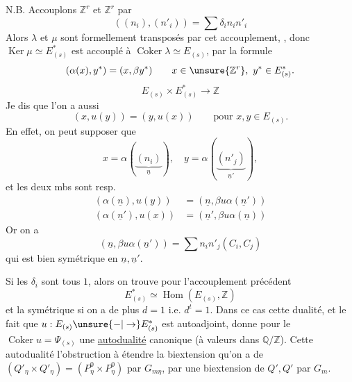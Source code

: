 N.B. Accouplons $\mathbb Z^r$ et $\mathbb Z^r$ par
\[
((n_i),(n'_i))=\sum\delta_i n_i n'_i
\]
Alors $\lambda$ et $\mu$ sont formellement transposés par cet accouplement,
, donc $\operatorname{Ker}\mu\simeq E^*_{(s)}$ est accouplé à $\operatorname{Coker}\lambda\simeq E_{(s)}$, par la formule
\[
(\alpha(x),y^*)=(x,\beta y^*)\qquad x\in\unsure{\mathbb Z^r},\ y^*\in E^*_{(s)}.
\]
\[
E_{(s)}\times E^*_{(s)}\longrightarrow\mathbb Z
\]
 Je dis que l'on a aussi
\[
(x,u(y))=(y,u(x))\qquad\text{pour }x,y\in E_{(s)}.
\]
En effet, on peut supposer que
\[
x=\alpha(\underbrace{(n_i)}_{\underline n}),\quad y=\alpha(\underbrace{(n'_j)}_{\underline n'}),
\]
et les deux mbs sont resp.
\[
\begin{aligned}
(\alpha(\underline n),u(y))&=(\underline n,\beta u\alpha(\underline n'))\\
(\alpha(\underline n'),u(x))&=(\underline n',\beta u\alpha(\underline n))
\end{aligned}
\]
Or on a
\[
(\underline n,\beta u\alpha(\underline n'))=\sum n_i n'_j(C_i,C_j)
\]
qui est bien symétrique en  $\underline n,\underline n'$.

Si les $\delta_i$ sont tous $1$, alors on trouve pour l'accouplement précédent
\[
E^*_{(s)}\simeq\operatorname{Hom}(E_{(s)},\mathbb Z)
\]
et la  symétrique si on a de plus $d=1$ i.e. $d^t=1$.
Dans ce cas cette dualité, et le fait que $u:E_{(s)}\unsure{-|\to}E^*_{(s)}$ est autoadjoint, donne pour le $\operatorname{Coker}u=\Psi_{(s)}$ une \uline{autodualité} canonique (à valeurs dans $\mathbb Q/\mathbb Z$). Cette autodualité  l'obstruction à étendre la biextension qu'on a de $(Q'_\eta\times Q'_\eta)=(P^0_\eta\times P^0_\eta)$ par $G_{m\eta}$, par une biextension de $Q',Q'$ par $G_m$.
